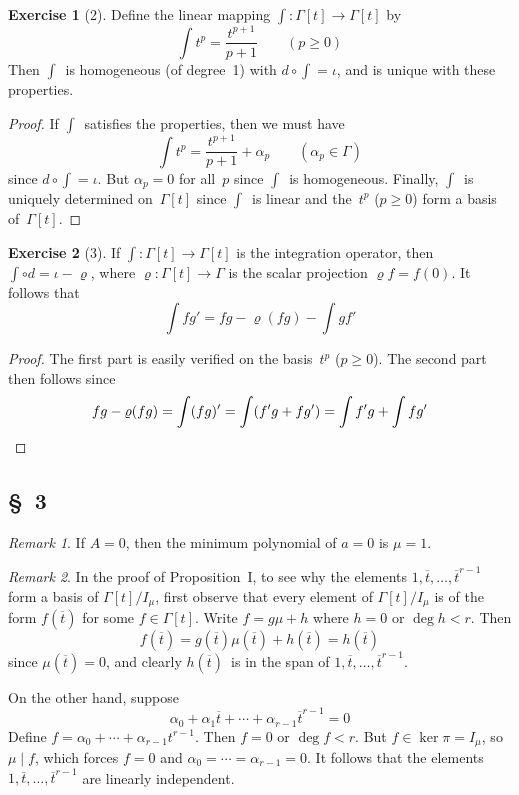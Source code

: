 \documentclass[letterpaper,12pt]{article}
\newcommand{\divides}{\mid}
\newcommand{\after}{\circ}
\newcommand{\proj}[1]{\overline{#1}}
\theoremstyle{definition}
\newtheorem*{exer}{Exercise}
\theoremstyle{remark}
\newtheorem*{rmk}{Remark}
\begin{document}
\begin{exer}[2]
Define the linear mapping \(\int:\Gamma[t]\to\Gamma[t]\) by
\[\int t^p=\frac{t^{p+1}}{p+1}\qquad(p\ge 0)\]
Then \(\int\)~is homogeneous (of degree~1) with \(d\after\int=\iota\), and is unique with these properties.
\end{exer}
\begin{proof}
If \(\int\)~satisfies the properties, then we must have
\[\int t^p=\frac{t^{p+1}}{p+1}+\alpha_p\qquad(\alpha_p\in\Gamma)\]
since \(d\after\int=\iota\). But \(\alpha_p=0\) for all~\(p\) since \(\int\)~is homogeneous. Finally, \(\int\)~is uniquely determined on~\(\Gamma[t]\) since \(\int\)~is linear and the~\(t^p\) (\(p\ge 0\)) form a basis of~\(\Gamma[t]\).
\end{proof}

\begin{exer}[3]
If \(\int:\Gamma[t]\to\Gamma[t]\) is the integration operator, then \(\int\after d=\iota-\varrho\), where \(\varrho:\Gamma[t]\to\Gamma\) is the scalar projection \(\varrho f=f(0)\). It follows that
\[\int fg'=fg-\varrho(fg)-\int gf'\]
\end{exer}
\begin{proof}
The first part is easily verified on the basis~\(t^p\) (\(p\ge 0\)). The second part then follows since
\[fg-\varrho(fg)=\int(fg)'=\int(f'g+fg')=\int f'g+\int fg'\qedhere\]
\end{proof}

\subsection*{\S~3}
\begin{rmk}
If \(A=0\), then the minimum polynomial of \(a=0\) is \(\mu=1\).
\end{rmk}

\begin{rmk}
In the proof of Proposition~I, to see why the elements \(1,\proj{t},\ldots,\proj{t}^{r-1}\) form a basis of \(\Gamma[t]/I_{\mu}\), first observe that every element of \(\Gamma[t]/I_{\mu}\) is of the form \(f(\proj{t})\) for some \(f\in\Gamma[t]\). Write \(f=g\mu+h\) where \(h=0\) or \(\deg h<r\). Then
\[f(\proj{t})=g(\proj{t})\mu(\proj{t})+h(\proj{t})=h(\proj{t})\]
since \(\mu(\proj{t})=0\), and clearly \(h(\proj{t})\)~is in the span of \(1,\proj{t},\ldots,\proj{t}^{r-1}\).

On the other hand, suppose
\[\alpha_0+\alpha_1\proj{t}+\cdots+\alpha_{r-1}\proj{t}^{r-1}=0\]
Define \(f=\alpha_0+\cdots+\alpha_{r-1}t^{r-1}\). Then \(f=0\) or \(\deg f<r\). But \(f\in\ker\pi=I_{\mu}\), so \(\mu\divides f\), which forces \(f=0\) and \(\alpha_0=\cdots=\alpha_{r-1}=0\). It follows that the elements \(1,\proj{t},\ldots,\proj{t}^{r-1}\) are linearly independent.
\end{rmk}
\end{document}
